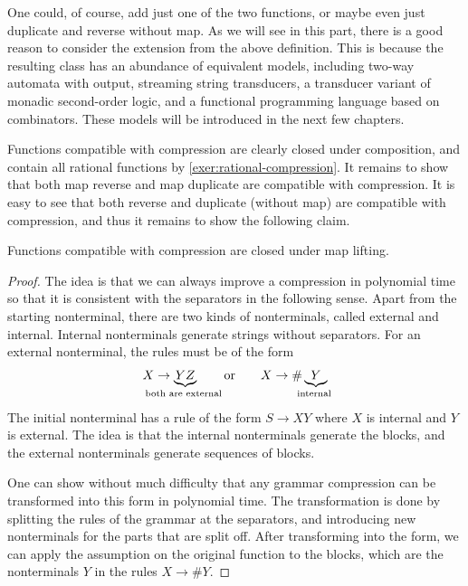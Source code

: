 One could, of course, add just one of the two functions, or maybe even just duplicate and reverse without map. As we will see in this part, there is a good reason to consider the extension from the above definition. This is because the resulting class has an  abundance of equivalent models, including two-way automata with output, streaming string transducers, a transducer variant of monadic second-order logic, and a functional programming language based on combinators. These models will be introduced in the next few chapters. 



\exerciseheader

  {
Functions compatible with compression are clearly closed under composition, and contain all rational functions by \cref{exer:rational-compression}. It remains to show that both map reverse and map duplicate are compatible with compression.  It is easy to see that both reverse and duplicate (without map) are compatible with compression, and thus it remains to show the following claim. 
\begin{claim}\label{claim:map-compression}
   Functions compatible with compression are closed under map lifting.
\end{claim}
\begin{proof}
    The idea is that we can always improve a compression in polynomial time so that it is consistent with the separators in the following sense. Apart from the starting nonterminal, there are two kinds of nonterminals, called external and internal. Internal nonterminals generate strings without separators. For an external nonterminal, the rules must be of the form 
    \begin{align*}
    X \to \myunderbrace{YZ}{both are external}\qquad \text{or} \qquad  X \to \#\myunderbrace{Y}{internal}
    \end{align*}
    The initial nonterminal has a rule of the form $S \to XY$ where $X$ is internal and $Y$ is external. The idea is that the internal nonterminals generate the blocks, and the external nonterminals generate sequences of blocks. 

    One can show without much difficulty that any grammar compression can be transformed into this form in polynomial time. The transformation is done by splitting the rules of the grammar at the separators, and introducing new nonterminals for the parts that are split off. After transforming into the form, we can apply the assumption on the original function to the blocks, which are the nonterminals $Y$ in the rules $X \to \#Y$.
\end{proof}
}
